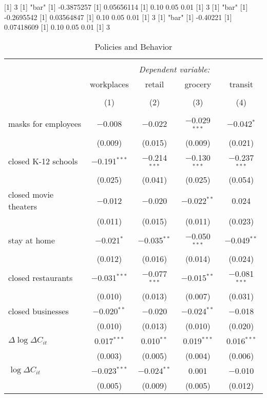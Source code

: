 [1] 3
[1] "bar"
[1] -0.3875257
[1] 0.05656114
[1] 0.10 0.05 0.01
[1] 3
[1] "bar"
[1] -0.2695542
[1] 0.03564847
[1] 0.10 0.05 0.01
[1] 3
[1] "bar"
[1] -0.40221
[1] 0.07418609
[1] 0.10 0.05 0.01
[1] 3

\begin{table}[!htbp] \centering 
  \caption{Policies and Behavior} 
  \label{} 
\begin{tabular}{@{\extracolsep{1pt}}lcccc} 
\\[-1.8ex]\hline 
\hline \\[-1.8ex] 
 & \multicolumn{4}{c}{\textit{Dependent variable:}} \\ 
\cline{2-5} 
 & workplaces & retail & grocery & transit \\ 
\\[-1.8ex] & (1) & (2) & (3) & (4)\\ 
\hline \\[-1.8ex] 
 masks for employees & $-$0.008 & $-$0.022 & $-$0.029$^{***}$ & $-$0.042$^{*}$ \\ 
  & (0.009) & (0.015) & (0.009) & (0.021) \\ 
  closed K-12 schools & $-$0.191$^{***}$ & $-$0.214$^{***}$ & $-$0.130$^{***}$ & $-$0.237$^{***}$ \\ 
  & (0.025) & (0.041) & (0.025) & (0.054) \\ 
  closed movie theaters & $-$0.012 & $-$0.020 & $-$0.022$^{**}$ & 0.024 \\ 
  & (0.011) & (0.015) & (0.011) & (0.023) \\ 
  stay at home & $-$0.021$^{*}$ & $-$0.035$^{**}$ & $-$0.050$^{***}$ & $-$0.049$^{**}$ \\ 
  & (0.012) & (0.016) & (0.014) & (0.024) \\ 
  closed restaurants & $-$0.031$^{***}$ & $-$0.077$^{***}$ & $-$0.015$^{**}$ & $-$0.081$^{***}$ \\ 
  & (0.010) & (0.013) & (0.007) & (0.031) \\ 
  closed businesses & $-$0.020$^{**}$ & $-$0.020 & $-$0.024$^{**}$ & $-$0.018 \\ 
  & (0.010) & (0.013) & (0.010) & (0.020) \\ 
  $\Delta \log \Delta C_{it}$ & 0.017$^{***}$ & 0.010$^{**}$ & 0.019$^{***}$ & 0.016$^{***}$ \\ 
  & (0.003) & (0.005) & (0.004) & (0.006) \\ 
  $\log \Delta C_{it}$ & $-$0.023$^{***}$ & $-$0.024$^{**}$ & 0.001 & $-$0.010 \\ 
  & (0.005) & (0.009) & (0.005) & (0.012) \\ 

\end{tabular}
\end{table}
